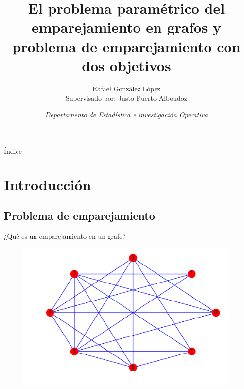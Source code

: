 \documentclass{beamer}
\title[El problema paramétrico del emparejamiento en grafos y problema de emparejamiento con dos objetivos]{\textbf{\textup{El problema paramétrico del emparejamiento en grafos y problema de emparejamiento con dos objetivos}}}
\author{Rafael González López\\ Supervisado por: Justo Puerto Albondoz\\}
\institute{Universidad de Sevilla}
\date{\textit{Departamento de Estadística e investigación Operativa}}
\begin{document}

\begin{frame}
  \titlepage
\end{frame}


\begin{frame}{Índice}
 \tableofcontents
\end{frame}



\section{Introducción}
\subsection{Problema de emparejamiento}

\begin{frame}{¿Qué es un emparejamiento en un grafo?}
\begin{figure}[h!]
\includegraphics[scale=0.45]{opt}
\end{figure}
\end{frame}

\end{document}

